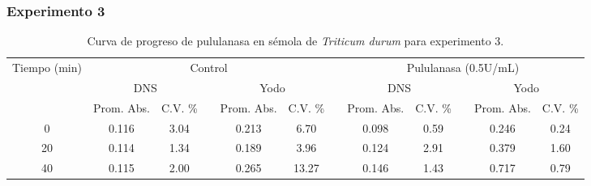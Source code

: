 \documentclass{article}
\begin{document}
\subsubsection{Experimento 3}
\begin{table}[H]
	\centering
	\caption{Curva de progreso de pululanasa en sémola de \textit{Triticum durum} para experimento 3.}
		\begin{adjustbox}{width=\textwidth}
	\begin{tabular}{cccccccccccc}
		\toprule
		\multicolumn{1}{c}{\multirow{3}[6]{*}{Tiempo (min)}} & \multicolumn{5}{c}{Control}           &       & \multicolumn{5}{c}{Pululanasa (0.5U/mL)} \\
		\cmidrule{2-6}\cmidrule{8-12}          & \multicolumn{2}{c}{DNS} &       & \multicolumn{2}{c}{Yodo} &       & \multicolumn{2}{c}{DNS} &       & \multicolumn{2}{c}{Yodo} \\
		\cmidrule{2-3}\cmidrule{5-6}\cmidrule{8-9}\cmidrule{11-12}          & Prom. Abs. & C.V. \% &       & Prom. Abs. & C.V. \% &       & Prom. Abs. & C.V. \% &       & Prom. Abs. & C.V. \% \\
		\midrule
		0     & 0.116 & 3.04  &       & 0.213 & 6.70  &       & 0.098 & 0.59  &       & 0.246 & 0.24 \\
		20    & 0.114 & 1.34  &       & 0.189 & 3.96  &       & 0.124 & 2.91  &       & 0.379 & 1.60 \\
		40    & 0.115 & 2.00  &       & 0.265 & 13.27 &       & 0.146 & 1.43  &       & 0.717 & 0.79 \\
		\bottomrule
	\end{tabular}%
	\end{adjustbox}
	\label{tab:e3.1}%
\end{table}%
\end{document}
